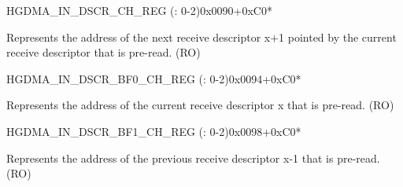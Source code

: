 \begin{register}{H}{GDMA\_IN\_DSCR\_CH\_REG (: 0-2)}{0x0090+0xC0*}\label{regdesc:GDMAINDSCRCHNREG}
%
\regnewline%
\begin{regdesc}\begin{reglist}
\label{fielddesc:GDMAINLINKDSCRCHN}\item [GDMA\_INLINK\_DSCR\_CH\regindex{n}] Represents the address of the next receive descriptor x+1 pointed by the current receive descriptor that is pre-read. (RO)
\end{reglist}\end{regdesc}
\end{register}


\begin{register}{H}{GDMA\_IN\_DSCR\_BF0\_CH\_REG (: 0-2)}{0x0094+0xC0*}\label{regdesc:GDMAINDSCRBF0CHNREG}
%
\regnewline%
\begin{regdesc}\begin{reglist}
\label{fielddesc:GDMAINLINKDSCRBF0CHN}\item [GDMA\_INLINK\_DSCR\_BF0\_CH\regindex{n}] Represents the address of the current receive descriptor x that is pre-read. (RO)
\end{reglist}\end{regdesc}
\end{register}


\begin{register}{H}{GDMA\_IN\_DSCR\_BF1\_CH\_REG (: 0-2)}{0x0098+0xC0*}\label{regdesc:GDMAINDSCRBF1CHNREG}
%
\regnewline%
\begin{regdesc}\begin{reglist}
\label{fielddesc:GDMAINLINKDSCRBF1CHN}\item [GDMA\_INLINK\_DSCR\_BF1\_CH\regindex{n}] Represents the address of the previous receive descriptor x-1 that is pre-read. (RO)
\end{reglist}\end{regdesc}
\end{register}


